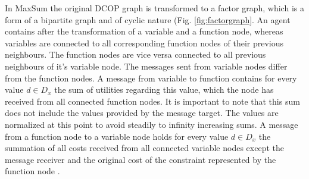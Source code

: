 In MaxSum the original DCOP graph is transformed to a factor graph, which is a form of a bipartite graph and of cyclic nature (Fig. \ref{fig:factorgraph}. An agent contains after the transformation of a variable and a function node, whereas variables are connected to all corresponding function nodes of  their previous neighbours. The function nodes are vice versa connected to all previous neighbours of it's variable node. 
The messages sent from variable nodes differ from the function nodes. A message from variable to function contains for every value \(d \in D_{x}\) the sum of utilities regarding this value, which the node has received from all connected function nodes. It is important to note that this sum does not include the values provided by the message target. The values are normalized at this point to avoid steadily to infinity increasing sums. A message from a function node to a variable node holds for every value  \(d \in D_{x}\)  the summation of all costs received from all connected variable nodes except the message receiver and the original cost of the constraint represented by the function node \cite{Zivan2012}.


    
    